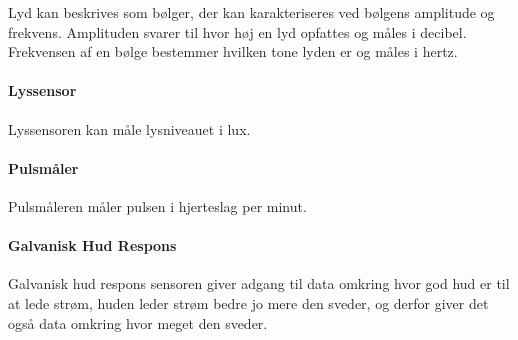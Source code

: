 Lyd kan beskrives som bølger, der kan karakteriseres ved bølgens amplitude og frekvens.
Amplituden svarer til hvor høj en lyd opfattes og måles i decibel.
Frekvensen af en bølge bestemmer hvilken tone lyden er og måles i hertz. \cite{sound}


\paragraph{Lyssensor}
Lyssensoren kan måle lysniveauet i lux.

\paragraph{Pulsmåler}
Pulsmåleren måler pulsen i hjerteslag per minut.

\paragraph{Galvanisk Hud Respons}
Galvanisk hud respons sensoren giver adgang til data omkring hvor god hud er til at lede strøm, huden leder strøm bedre jo mere den sveder, og derfor giver det også data omkring hvor meget den sveder.